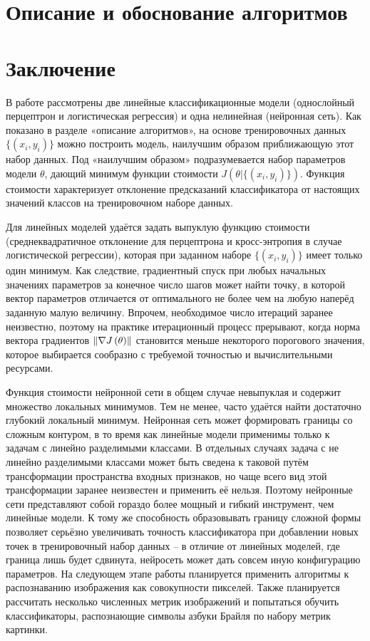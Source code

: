 \documentclass[main.tex]{subfiles}
\begin{document}
\section{Описание и обоснование алгоритмов}


\newpage
\section{Заключение}
В работе рассмотрены две линейные классификационные модели (однослойный перцептрон и логистическая регрессия) и одна нелинейная (нейронная сеть). Как показано в разделе «описание алгоритмов», на основе тренировочных данных $\{(x_i,y_i)\}$ можно построить модель, наилучшим образом приближающую этот набор данных. Под «наилучшим образом» подразумевается набор параметров модели $\theta$, дающий минимум функции стоимости $J(\theta|\{(x_i,y_i)\})$. Функция стоимости характеризует отклонение предсказаний классификатора от настоящих значений классов на тренировочном наборе данных.

Для линейных моделей удаётся задать выпуклую функцию стоимости (среднеквадратичное отклонение для перцептрона и кросс-энтропия в случае логистической регрессии), которая при заданном наборе $\{(x_i,y_i)\}$ имеет только один минимум. Как следствие, градиентный спуск при любых начальных значениях параметров за конечное число шагов может найти точку, в которой вектор параметров отличается от оптимального не более чем на любую наперёд заданную малую величину. Впрочем, необходимое число итераций заранее неизвестно, поэтому на практике итерационный процесс прерывают, когда норма вектора градиентов $\left\lVert\nabla J\left(\theta\right)\right\rVert$ становится меньше некоторого порогового значения, которое выбирается сообразно с требуемой точностью и вычислительными ресурсами.

Функция стоимости нейронной сети в общем случае невыпуклая и содержит множество локальных минимумов. Тем не менее, часто удаётся найти достаточно глубокий локальный минимум. Нейронная сеть может формировать границы со сложным контуром, в то время как линейные модели применимы только к задачам с линейно разделимыми классами. В отдельных случаях задача с не линейно разделимыми классами может быть сведена к таковой путём трансформации пространства входных признаков, но чаще всего вид этой трансформации заранее неизвестен и применить её нельзя. Поэтому нейронные сети представляют собой гораздо более мощный и гибкий инструмент, чем линейные модели. К тому же способность образовывать границу сложной формы позволяет серьёзно увеличивать точность классификатора при добавлении новых точек в тренировочный набор данных – в отличие от линейных моделей, где граница лишь будет сдвинута, нейросеть может дать совсем иную конфигурацию параметров.
На следующем этапе работы планируется применить алгоритмы к распознаванию изображения как совокупности пикселей. Также планируется рассчитать несколько численных метрик изображений и попытаться обучить классификаторы, распознающие символы азбуки Брайля по набору метрик картинки.
\end{document}
